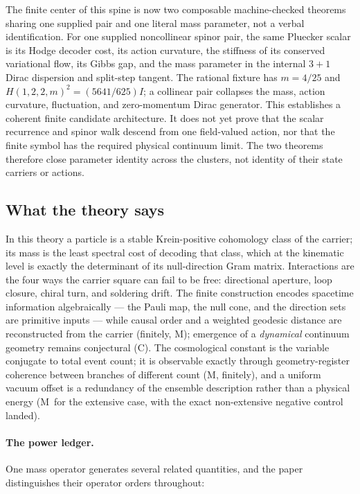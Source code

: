 \documentclass[11pt]{article}
\newcommand{\Mtag}{\textcolor{verified}{\textsc{M}}}
\newcommand{\Ctag}{\textcolor{conjectural}{\textsc{C}}}
\begin{document}
The finite center of this spine is now two composable machine-checked theorems
sharing one supplied pair and one literal mass parameter, not a verbal
identification.  For one supplied noncollinear spinor pair, the same
Pluecker scalar is its Hodge decoder cost, its action curvature, the stiffness
of its conserved variational flow, its Gibbs gap, and the mass parameter in
the internal $3+1$ Dirac dispersion and split-step tangent.  The rational
fixture has $m=4/25$ and
$H(1,2,2,m)^2=(5641/625)I$; a collinear pair collapses the mass, action
curvature, fluctuation, and zero-momentum Dirac generator.  This establishes a
coherent finite candidate architecture.  It does not yet prove that the scalar
recurrence and spinor walk descend from one field-valued action, nor that the
finite symbol has the required physical continuum limit.  The two theorems
therefore close parameter identity across the clusters, not identity of their
state carriers or actions.

\subsection{What the theory says}

In this theory a particle is a stable Krein-positive cohomology class of the
carrier; its mass is the least spectral cost of decoding that class, which at
the kinematic level is exactly the determinant of its null-direction Gram
matrix.  Interactions are the four ways the carrier square can fail to be
free: directional aperture, loop closure, chiral turn, and soldering drift.
The finite construction encodes spacetime information algebraically --- the
Pauli map, the null cone, and the direction sets are primitive inputs ---
while causal order and a weighted geodesic distance are reconstructed from
the carrier (finitely, \Mtag); emergence of a \emph{dynamical} continuum
geometry remains conjectural (\Ctag).  The cosmological constant is the
variable conjugate to total event
count; it is observable exactly through geometry-register coherence between
branches of different count (\Mtag, finitely), and a uniform vacuum offset is
a redundancy of the ensemble description rather than a physical energy
(\Mtag\ for the extensive case, with the exact non-extensive negative
control landed).

\paragraph{The power ledger.}  One mass operator generates several related
quantities, and the paper distinguishes their operator orders throughout:
\end{document}
